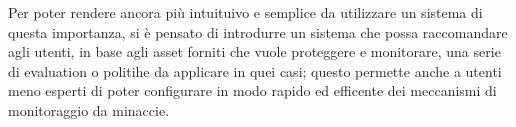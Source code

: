 Per poter rendere ancora più intuituivo e semplice da utilizzare un sistema di questa importanza, si è pensato di introdurre un sistema
che possa raccomandare agli utenti, in base agli asset forniti che vuole proteggere e monitorare, una serie di evaluation o politihe da
applicare in quei casi; questo permette anche a utenti meno esperti di poter configurare in modo rapido ed efficente dei meccanismi di
monitoraggio da minaccie.